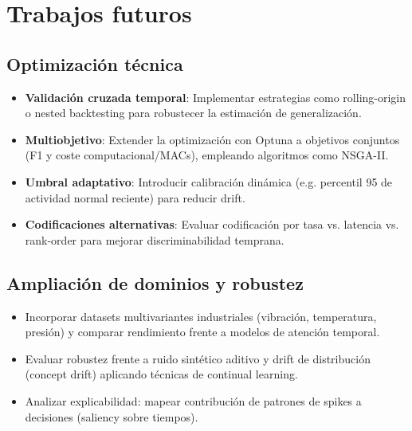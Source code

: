 \section{Trabajos futuros}
\subsection{Optimización técnica}
\begin{itemize}
    \item \textbf{Validación cruzada temporal}: Implementar estrategias como rolling-origin o nested backtesting para robustecer la estimación de generalización.
    \item \textbf{Multiobjetivo}: Extender la optimización con Optuna a objetivos conjuntos (F1 y coste computacional/MACs), empleando algoritmos como NSGA-II.
    \item \textbf{Umbral adaptativo}: Introducir calibración dinámica (e.g. percentil 95 de actividad normal reciente) para reducir drift.
    \item \textbf{Codificaciones alternativas}: Evaluar codificación por tasa vs. latencia vs. rank-order para mejorar discriminabilidad temprana.
\end{itemize}

\subsection{Ampliación de dominios y robustez}
\begin{itemize}
    \item Incorporar datasets multivariantes industriales (vibración, temperatura, presión) y comparar rendimiento frente a modelos de atención temporal.
    \item Evaluar robustez frente a ruido sintético aditivo y drift de distribución (concept drift) aplicando técnicas de continual learning.
    \item Analizar explicabilidad: mapear contribución de patrones de spikes a decisiones (saliency sobre tiempos).
\end{itemize}

